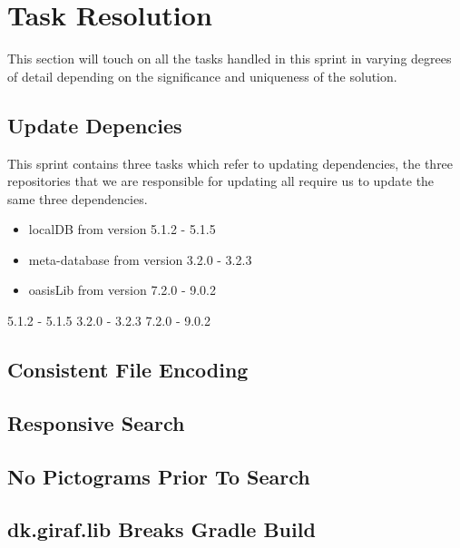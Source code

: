 \section{Task Resolution}
This section will touch on all the tasks handled in this sprint in varying degrees of detail depending on the significance and uniqueness of the solution.

\subsection{Update Depencies}
This sprint contains three tasks which refer to updating dependencies, the three repositories that we are responsible for updating all require us to update the same three dependencies.
\begin{itemize}
    \item localDB from version 5.1.2 - 5.1.5
    \item meta-database from version 3.2.0 - 3.2.3
    \item oasisLib from version 7.2.0 - 9.0.2
\end{itemize}


5.1.2 - 5.1.5
3.2.0 - 3.2.3
7.2.0 - 9.0.2
\subsection{Consistent File Encoding}
\subsection{Responsive Search}
\subsection{No Pictograms Prior To Search}
\subsection{dk.giraf.lib Breaks Gradle Build}
